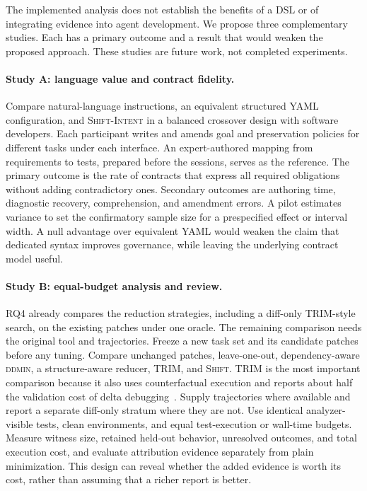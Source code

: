 \documentclass[a4paper,fleqn]{cas-sc}
\newcommand{\tool}{\textsc{Shift}}
\newcommand{\dsl}{\textsc{Shift-Intent}}
\begin{document}
The implemented analysis does not establish the benefits of a DSL or of integrating evidence into agent development. We propose three complementary studies. Each has a primary outcome and a result that would weaken the proposed approach. These studies are future work, not completed experiments.

\paragraph{Study A: language value and contract fidelity.}
Compare natural-language instructions, an equivalent structured YAML configuration, and \dsl{} in a balanced crossover design with software developers. Each participant writes and amends goal and preservation policies for different tasks under each interface. An expert-authored mapping from requirements to tests, prepared before the sessions, serves as the reference. The primary outcome is the rate of contracts that express all required obligations without adding contradictory ones. Secondary outcomes are authoring time, diagnostic recovery, comprehension, and amendment errors. A pilot estimates variance to set the confirmatory sample size for a prespecified effect or interval width. A null advantage over equivalent YAML would weaken the claim that dedicated syntax improves governance, while leaving the underlying contract model useful.

\paragraph{Study B: equal-budget analysis and review.}
RQ4 already compares the reduction strategies, including a diff-only TRIM-style search, on the existing patches under one oracle. The remaining comparison needs the original tool and trajectories. Freeze a new task set and its candidate patches before any tuning. Compare unchanged patches, leave-one-out, dependency-aware \textsc{ddmin}, a structure-aware reducer, TRIM, and \tool{}. TRIM is the most important comparison because it also uses counterfactual execution and reports about half the validation cost of delta debugging~\citep{mathai2026trim}. Supply trajectories where available and report a separate diff-only stratum where they are not. Use identical analyzer-visible tests, clean environments, and equal test-execution or wall-time budgets. Measure witness size, retained held-out behavior, unresolved outcomes, and total execution cost, and evaluate attribution evidence separately from plain minimization. This design can reveal whether the added evidence is worth its cost, rather than assuming that a richer report is better.
\end{document}

